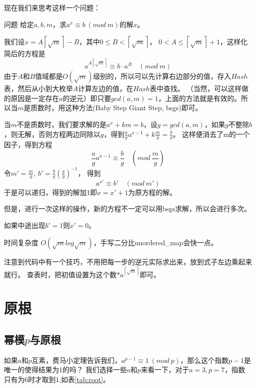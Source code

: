 现在我们来思考这样一个问题：

\begin{custom}{问题}
	给定$a,b,m$，求$a^x\equiv b \ (mod \ m)$的解$x$。
\end{custom}

\begin{solution}
	
	我们设$x=A\left \lceil \sqrt{m} \right \rceil -B$，其中$0\le B< \left \lceil \sqrt{m} \right \rceil$， $0< A\le \left \lceil \sqrt{m} \right \rceil+1$，这样化简后的方程是
	$$
	a^{A\left \lceil \sqrt{m} \right \rceil}\equiv b\cdot a^B \quad (mod \ m)
	$$
	由于$A$和$B$值域都是$O(\sqrt{m})$级别的，所以可以先计算右边部分的值，存入$Hash$表，然后从小到大枚举$A$计算左边的值，在$Hash$表中查找。
	（当然，可以这样做的原因是一定存在$a$的逆元）即只要$gcd(a,m)=1$，上面的方法就是有效的。所以当$m$是质数时，用这种方法(Baby Step Giant Step, bsgs)即可。
	
	{\heiti 当$m$不是质数时}，我们要求解的是$a^x+km=b$，设$g=gcd(a,m)$，如果$g$不整除$b$，则无解，否则方程两边同除以$g$，得到$\frac{a}{g}a^{x-1}+k\frac{m}{g}=\frac{b}{g}$。
	这样便消去了m的一个因子，得到方程
	$$
	\frac{a}{g}a^{x-1}\equiv \frac{b}{g}\quad (mod \   \frac{m}{g})
	$$
	令${m}'=\frac{m}{g} ,\ b'=\frac{b}{g}(\frac{a}{g})^{-1}$， 得到
	$$
	a^{x'}\equiv b' \quad (mod \ m')
	$$
	于是可以递归，得到的解加1即$x=x'+1$为原方程的解。
	
	{\heiti 但是，进行一次这样的操作，新的方程不一定可以用bsgs求解，所以会进行多次。}
	
	如果中途出现$b'=1$则$x'=0$。
\end{solution}

时间复杂度  $O(\sqrt{m}log\sqrt{m})$，手写二分比unordered\_map会快一点。



注意到代码中有一个技巧，不用把每一步的逆元实际求出来，放到式子左边乘起来就行。
查表时，把初值设置为这个数$*a^{\left \lceil \sqrt{m} \right \rceil}$即可。


\section{原根}
\subsection{幂模$p$与原根}

如果$a$和$p$互素，费马小定理告诉我们，$a^{p-1} \equiv 1\ (mod\ p)$，那么这个指数$p-1$是唯一的使得结果为1的吗？
我们选择一些$a$和$p$来看一下，对于$a=3,p=7$，指数只有为6时才取到1,如表\ref{tab:root}。



